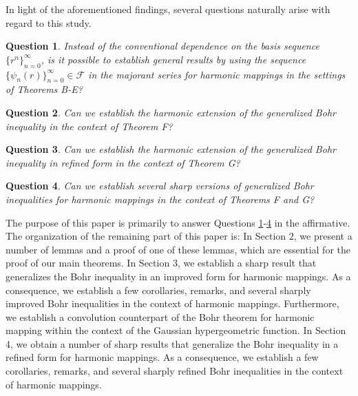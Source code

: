\documentclass[11pt,reqno]{amsart}
\newtheorem{que}{Question}[section]
\newtheorem{open problem}{Open problem}[section]
\newcommand{\F}{{\mathcal{F}}}
\numberwithin{equation}{section}
\begin{document}
\noindent In light of the aforementioned findings, several questions naturally arise with regard to this study.
\begin{que}\label{Q1} Instead of the conventional dependence on the basis sequence $\{r^n\}_{n=0}^\infty$, is it possible to establish general results by using the sequence 
$\{\psi_n(r)\}_{n=0}^\infty\in\F$ in the majorant series for harmonic mappings in the settings of \textrm{Theorems B-E}?
 \end{que} 
\begin{que}\label{Q2} Can we establish the harmonic extension of the generalized Bohr inequality in the context of  \textrm{Theorem F}?\end{que}
\begin{que}\label{Q3} Can we establish the harmonic extension of the generalized Bohr inequality in refined form in the context of  \textrm{Theorem G}?\end{que}
\begin{que}\label{Q4} Can we establish several sharp versions of generalized Bohr inequalities for harmonic mappings in the context of \textrm{Theorems F} and \textrm{G}? \end{que}
The purpose of this paper is primarily to answer Questions \ref{Q1}-\ref{Q4} in the affirmative.\\[2mm]
The organization of the remaining part of this paper is: In Section $2$, we present a number of lemmas and a proof of one of these lemmas, which are essential for the proof of our main theorems. In Section $3$, we establish a sharp result that generalizes the Bohr inequality in an improved form for harmonic mappings. As a consequence, we establish a few 
corollaries, remarks, and several sharply improved Bohr inequalities in the context of harmonic mappings. Furthermore, we establish a convolution counterpart of the Bohr theorem for 
harmonic mapping within the context of the Gaussian hypergeometric function. In Section 4, we obtain a number of sharp results that generalize the Bohr inequality in a refined form 
for harmonic mappings. As a consequence, we establish a few 
corollaries, remarks, and several sharply refined Bohr inequalities in the context of harmonic mappings.
\end{document}
